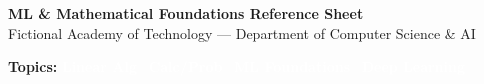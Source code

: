 \documentclass[10pt]{article}
\begin{document}
\begin{center}
    \begin{tcolorbox}[
        colback=headerBg,
        colframe=laColor!80!black,
        arc=3pt,
        left=6pt,
        right=6pt,
        top=4pt,
        bottom=4pt,
        boxrule=0.8pt
    ]
        \begin{minipage}[c]{0.55\textwidth}
            {\large\bfseries\textcolor{laColor}{ML \& Mathematical Foundations Reference Sheet}} \\[1pt]
            {\tiny\textcolor{gray!80!black}{Fictional Academy of Technology --- Department of Computer Science \& AI}}
        \end{minipage}%
        \begin{minipage}[c]{0.45\textwidth}
            \hfill
            {\tiny
            \textbf{Topics:} 
            \colorbox{laColor}{\textcolor{white}{\textbf{Linear Alg}}} \ 
            \colorbox{calcColor}{\textcolor{white}{\textbf{Calc/Prob}}} \ 
            \colorbox{mlColor}{\textcolor{white}{\textbf{ML Foundations}}} \ 
            \colorbox{dlColor}{\textcolor{white}{\textbf{Deep Learning}}}
            }
        \end{minipage}
    \end{tcolorbox}
\end{center}
\vspace{-6pt}
\end{document}
